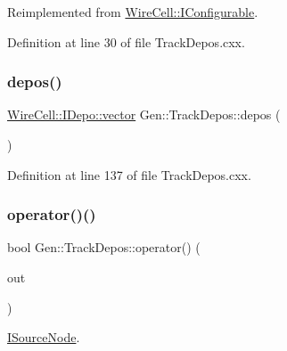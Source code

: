 Reimplemented from \hyperlink{class_wire_cell_1_1_i_configurable_a54841b2da3d1ea02189478bff96f7998}{Wire\+Cell\+::\+I\+Configurable}.



Definition at line 30 of file Track\+Depos.\+cxx.

\mbox{\label{class_wire_cell_1_1_gen_1_1_track_depos_a443e4c53c68ad46102395e7e86d24653}} 
\subsubsection{\texorpdfstring{depos()}{depos()}}
{\footnotesize\ttfamily \hyperlink{class_wire_cell_1_1_i_data_ae1a9f863380499bb43f39fabb6276660}{Wire\+Cell\+::\+I\+Depo\+::vector} Gen\+::\+Track\+Depos\+::depos (\begin{DoxyParamCaption}{ }\end{DoxyParamCaption})}



Definition at line 137 of file Track\+Depos.\+cxx.

\mbox{\label{class_wire_cell_1_1_gen_1_1_track_depos_a336b9bcb6d5d3e494ff295d7a70c94cc}} 
\subsubsection{\texorpdfstring{operator()()}{operator()()}}
{\footnotesize\ttfamily bool Gen\+::\+Track\+Depos\+::operator() (\begin{DoxyParamCaption}\item[{\hyperlink{class_wire_cell_1_1_i_data_aff870b3ae8333cf9265941eef62498bc}{I\+Depo\+::pointer} \&}]{out }\end{DoxyParamCaption})\hspace{0.3cm}{\ttfamily [virtual]}}



\hyperlink{class_wire_cell_1_1_i_source_node}{I\+Source\+Node}. 



